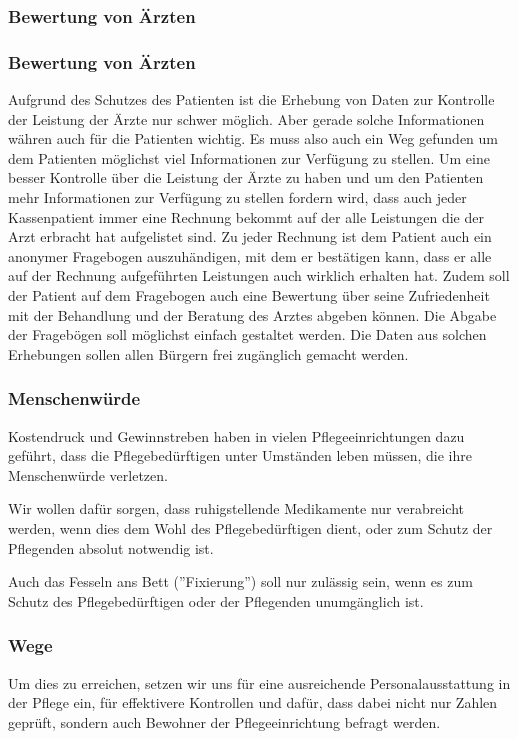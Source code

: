 \subsubsection{Bewertung von Ärzten}

\subsubsection{Bewertung von Ärzten}
\abstimmung
Aufgrund des Schutzes des Patienten ist die Erhebung von Daten zur Kontrolle der Leistung der Ärzte nur schwer möglich. Aber gerade solche Informationen währen auch für die Patienten wichtig. Es muss also auch ein Weg gefunden um dem Patienten möglichst viel Informationen zur Verfügung zu stellen. Um eine besser Kontrolle über die Leistung der Ärzte zu haben und um den Patienten mehr Informationen zur Verfügung zu stellen fordern wird, dass auch jeder Kassenpatient immer eine Rechnung bekommt auf der alle Leistungen die der Arzt erbracht hat aufgelistet sind. Zu jeder Rechnung ist dem Patient auch ein anonymer Fragebogen auszuhändigen, mit dem er bestätigen kann, dass er alle auf der Rechnung aufgeführten Leistungen auch wirklich erhalten hat. Zudem soll der Patient auf dem Fragebogen auch eine Bewertung über seine Zufriedenheit mit der Behandlung und der Beratung des Arztes abgeben können. Die Abgabe der Fragebögen soll möglichst einfach gestaltet werden. Die Daten aus solchen Erhebungen sollen allen Bürgern frei zugänglich gemacht werden.
 

\subsubsection{Menschenwürde}
\abstimmung
Kostendruck und Gewinnstreben haben in vielen Pflegeeinrichtungen dazu geführt, dass die Pflegebedürftigen unter Umständen leben müssen, die ihre Menschenwürde verletzen.

Wir wollen dafür sorgen, dass ruhigstellende Medikamente nur verabreicht werden, wenn dies dem Wohl des Pflegebedürftigen dient, oder zum Schutz der Pflegenden absolut notwendig ist.

Auch das Fesseln ans Bett (''Fixierung'') soll nur zulässig sein, wenn es zum Schutz des Pflegebedürftigen oder der Pflegenden unumgänglich ist.

\subsubsection{Wege}
\abstimmung
Um dies zu erreichen, setzen wir uns für eine ausreichende Personalausstattung in der Pflege ein, für effektivere Kontrollen und dafür, dass dabei nicht nur Zahlen geprüft, sondern auch Bewohner der Pflegeeinrichtung befragt werden.

